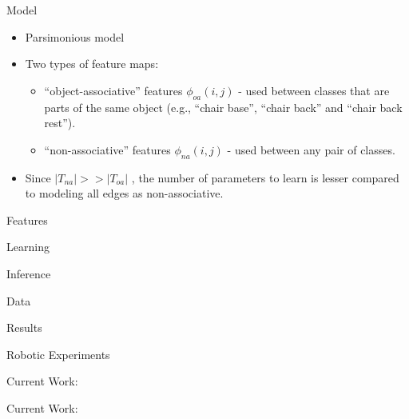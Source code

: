 \documentclass{beamer}
\newcommand{\fe}[3]{{\phi_{#1}(#2,#3)}}%
\begin{document}
\begin{frame}{Model}
\begin{itemize}
\item Parsimonious model

\item Two types of feature maps: 
\begin{itemize}
\item ``object-associative'' features $\fe{oa}{i}{j}$ - used between classes that are parts of the same object (e.g., ``chair base'', ``chair back'' and ``chair back rest''). 
\item ``non-associative'' features $\fe{na}{i}{j}$ -  used between any pair of classes.
\end{itemize}
\item Since $|T_{na}| >> |T_{oa}|$ , the number of parameters to learn is lesser compared to modeling all edges as non-associative.
\end{itemize}
\end{frame}


\begin{frame}{Features}

\end{frame}

\begin{frame}{Learning}

\end{frame}

\begin{frame}{Inference}
 
 
\end{frame}

\begin{frame}{Data}

\end{frame}


\begin{frame}{Results }
\end{frame}

\begin{frame}{Robotic Experiments}
\end{frame}

\begin{frame}{Current Work: }
\end{frame}

\begin{frame}{Current Work: }
\end{frame}
\end{document}
